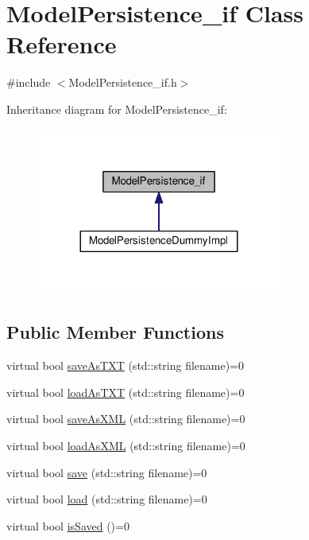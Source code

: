\hypertarget{class_model_persistence__if}{}\section{Model\+Persistence\+\_\+if Class Reference}
\label{class_model_persistence__if}


{\ttfamily \#include $<$Model\+Persistence\+\_\+if.\+h$>$}



Inheritance diagram for Model\+Persistence\+\_\+if\+:\nopagebreak
\begin{figure}[H]
\begin{center}
\leavevmode
\includegraphics[width=228pt]{class_model_persistence__if__inherit__graph}
\end{center}
\end{figure}
\subsection*{Public Member Functions}
\begin{DoxyCompactItemize}
\item 
virtual bool \hyperlink{class_model_persistence__if_a4cabe06b4f610b9237c52208ee6c51bd}{save\+As\+T\+XT} (std\+::string filename)=0
\item 
virtual bool \hyperlink{class_model_persistence__if_af1ee016d7810fc3798b5bf013398de7f}{load\+As\+T\+XT} (std\+::string filename)=0
\item 
virtual bool \hyperlink{class_model_persistence__if_afb8e1011e873757febfb0d055d592d38}{save\+As\+X\+ML} (std\+::string filename)=0
\item 
virtual bool \hyperlink{class_model_persistence__if_a8c44f9b2e917b33812cbaa7c844854c8}{load\+As\+X\+ML} (std\+::string filename)=0
\item 
virtual bool \hyperlink{class_model_persistence__if_a960acf977c56ed52a153524c6ed8d4c6}{save} (std\+::string filename)=0
\item 
virtual bool \hyperlink{class_model_persistence__if_a48f90bbb37e106ee4b423075660d5a73}{load} (std\+::string filename)=0
\item 
virtual bool \hyperlink{class_model_persistence__if_aac4b87300487d7b5a126979671c05d16}{is\+Saved} ()=0
\end{DoxyCompactItemize}



